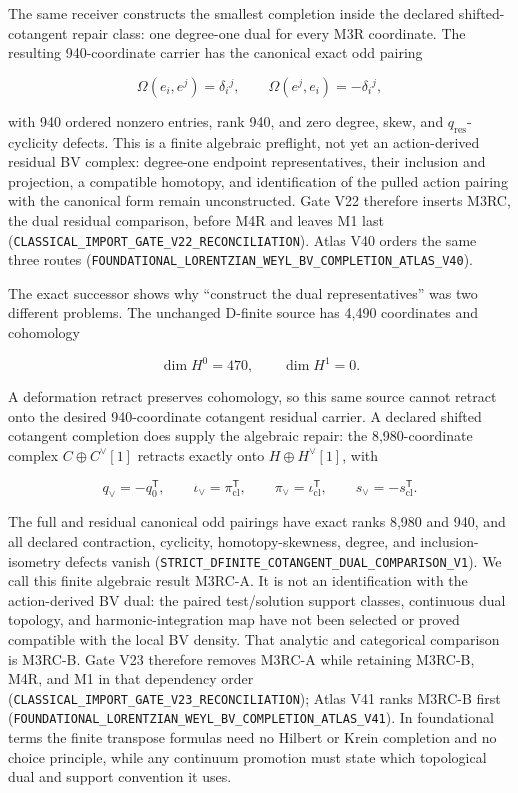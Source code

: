 \documentclass[11pt]{article}
\theoremstyle{definition}
\theoremstyle{remark}
\newcommand{\cert}[1]{\nolinkurl{#1}}
\begin{document}
The same receiver constructs the smallest completion inside the declared
shifted-cotangent repair class: one degree-one dual for every M3R coordinate.
The resulting 940-coordinate carrier has the canonical exact odd pairing

\[
  \Omega(e_i,e^j)=\delta_i{}^j,
  \qquad
  \Omega(e^j,e_i)=-\delta_i{}^j,
\]

with 940 ordered nonzero entries, rank 940, and zero degree, skew, and
\(q_{\mathrm{res}}\)-cyclicity defects.  This is a finite algebraic preflight,
not yet an action-derived residual BV complex: degree-one endpoint
representatives, their inclusion and projection, a compatible homotopy, and
identification of the pulled action pairing with the canonical form remain
unconstructed.  Gate V22 therefore inserts M3RC, the dual residual comparison,
before M4R and leaves M1 last
(\cert{CLASSICAL_IMPORT_GATE_V22_RECONCILIATION}).  Atlas V40 orders the same
three routes
(\cert{FOUNDATIONAL_LORENTZIAN_WEYL_BV_COMPLETION_ATLAS_V40}).

The exact successor shows why ``construct the dual representatives'' was two
different problems.  The unchanged D-finite source has 4,490 coordinates and
cohomology

\[
  \dim H^0=470,
  \qquad
  \dim H^1=0.
\]

A deformation retract preserves cohomology, so this same source cannot retract
onto the desired 940-coordinate cotangent residual carrier.  A declared
shifted cotangent completion does supply the algebraic repair: the
8,980-coordinate complex \(C\oplus C^\vee[1]\) retracts exactly onto
\(H\oplus H^\vee[1]\), with

\[
 q_\vee=-q_0^{\mathsf T},\qquad
 \iota_\vee=\pi_{\mathrm{cl}}^{\mathsf T},\qquad
 \pi_\vee=\iota_{\mathrm{cl}}^{\mathsf T},\qquad
 s_\vee=-s_{\mathrm{cl}}^{\mathsf T}.
\]

The full and residual canonical odd pairings have exact ranks 8,980 and 940,
and all declared contraction, cyclicity, homotopy-skewness, degree, and
inclusion-isometry defects vanish
(\cert{STRICT_DFINITE_COTANGENT_DUAL_COMPARISON_V1}).  We call this finite
algebraic result M3RC-A.  It is not an identification with the action-derived
BV dual: the paired test/solution support classes, continuous dual topology,
and harmonic-integration map have not been selected or proved compatible with
the local BV density.  That analytic and categorical comparison is M3RC-B.
Gate V23 therefore removes M3RC-A while retaining M3RC-B, M4R, and M1 in that
dependency order (\cert{CLASSICAL_IMPORT_GATE_V23_RECONCILIATION}); Atlas V41
ranks M3RC-B first
(\cert{FOUNDATIONAL_LORENTZIAN_WEYL_BV_COMPLETION_ATLAS_V41}).  In foundational
terms the finite transpose formulas need no Hilbert or Krein completion and no
choice principle, while any continuum promotion must state which topological
dual and support convention it uses.
\end{document}
